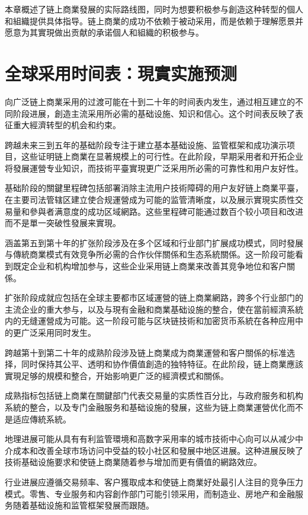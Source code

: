 \documentclass[
  Letterpaper,
]{scrbook}
\begin{document}
本章概述了链上商業發展的实际路线图，同时为想要积极参与創造这种转型的個人和組織提供具体指导。链上商業的成功不依赖于被动采用，而是依赖于理解愿景并愿意为其實現做出贡献的承诺個人和組織的积极参与。

\section{全球采用时间表：現實实施预测}\label{ux5168ux7403ux91c7ux7528ux65f6ux95f4ux8868ux73feux5be6ux5b9eux65bdux9884ux6d4b}

向广泛链上商業采用的过渡可能在十到二十年的时间表内发生，通过相互建立的不同阶段进展，創造主流采用所必需的基础设施、知识和信心。这个时间表反映了表征重大經濟转型的机会和约束。

跨越未来三到五年的基础阶段专注于建立基本基础设施、监管框架和成功演示项目，这些证明链上商業在显著規模上的可行性。在此阶段，早期采用者和开拓企业将發展運營专业知识，而技術平臺實現更广泛采用所必需的可靠性和用户友好性。

基础阶段的關鍵里程碑包括部署消除主流用户技術障碍的用户友好链上商業平臺，在主要司法管辖区建立使合规運營成为可能的监管清晰度，以及展示實現实质性交易量和參與者满意度的成功区域網路。这些里程碑可能通过数百个较小项目和改进而不是單一突破性發展来實現。

涵盖第五到第十年的扩张阶段涉及在多个区域和行业部门扩展成功模式，同时發展与傳統商業模式有效竞争所必需的合作伙伴關係和生态系統關係。这一阶段可能看到既定企业和机构增加参与，这些企业采用链上商業来改善其竞争地位和客户關係。

扩张阶段成就应包括在全球主要都市区域運營的链上商業網路，跨多个行业部门的主流企业的重大参与，以及与現有金融和商業基础设施的整合，使在當前經濟系統内的无缝運營成为可能。这一阶段可能与区块链技術和加密货币系統在各种应用中的更广泛采用同时发生。

跨越第十到第二十年的成熟阶段涉及链上商業成为商業運營和客户關係的标准选择，同时保持其公平、透明和协作價值創造的独特特征。在此阶段，链上商業應該實現足够的規模和整合，开始影响更广泛的經濟模式和關係。

成熟指标包括链上商業在關鍵部门代表交易量的实质性百分比，与政府服务和机构系統的整合，以及专门金融服务和基础设施的發展，这些为链上商業運營优化而不是适应傳統系統。

地理进展可能从具有有利监管環境和高数字采用率的城市技術中心向可以从减少中介成本和改善全球市场访问中受益的较小社区和發展中地区进展。这种进展反映了技術基础设施要求和使链上商業随着参与增加而更有價值的網路效应。

行业进展应遵循交易频率、客户獲取成本和使链上商業好处最引人注目的竞争压力模式。零售、专业服务和内容創作部门可能引领采用，而制造业、房地产和金融服务随着基础设施和监管框架發展而跟随。
\end{document}
